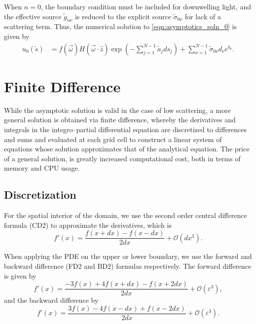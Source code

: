 When $n=0$, the boundary condition must be included for downwelling light,
and the effective source $\tilde{g}_{n\nu}$ is reduced to the explicit source $\tilde{\sigma}_{0\nu}$
for lack of a scattering term.
Thus, the numerical solution to \eqref{eqn:asymptotics_soln_0} is given by
\begin{align}
  u_0(\tilde{s}) &= f(\vec{\omega})H(\vec{\omega}\cdot\hat{z}) \exp\left( -\sum_{j=1}^{N-1}\tilde{a}_jds_j\right)
  + \sum_{\nu=1}^{N-1} \tilde{\sigma}_{0\nu}d_\nu e^{b_\nu}.
\end{align}

\section{Finite Difference}
While the asymptotic solution is valid in the case of low scattering, a more general solution is obtained via finite difference, whereby the derivatives and integrals in the integro--partial differential equation are discretized to differences and sums and evaluated at each grid cell to construct a linear system of equations whose solution approximates that of the analytical equation.
The price of a general solution, is greatly increased computational cost, both in terms of memory and CPU usage.

\subsection{Discretization}
\label{sec:discretization}

For the spatial interior of the domain, we use the second order central difference formula (CD2) to approximate the derivatives, which is
\begin{equation*}
    f'(x) = \frac{f(x+dx)-f(x-dx)}{2dx} + \mathcal{O}(dx^3).
\end{equation*}

When applying the PDE on the upper or lower boundary, we use the forward and backward difference (FD2 and BD2) formulas respectively.
The forward difference is given by
\begin{equation*}
    \label{eqn:FD2}
    f'(x) = \frac{-3f(x)+4f(x+dx)-f(x+2dx)}{2dx} + \mathcal{O}(\varepsilon^3),
\end{equation*}
and the backward difference by
\begin{equation*}
    \label{eqn:BD2}
    f'(x) = \frac{3f(x)-4f(x-dx)+f(x-2dx)}{2dx} + \mathcal{O}(\varepsilon^3).
\end{equation*}

